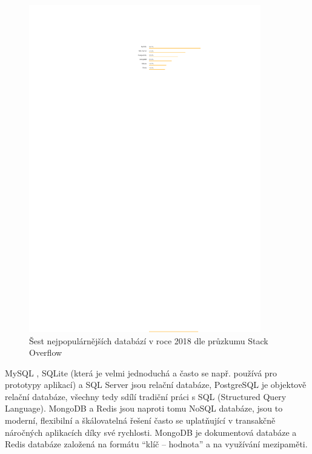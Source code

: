     \begin{figure}[ht]\centering
    	\includegraphics[width=0.9\textwidth]{img/stack-stats-db}
    	\caption[Popularita databází v roce 2018 dle průzkumu Stack Overflow]{Šest nejpopulárnějších databází v roce 2018 dle průzkumu Stack Overflow \cite{stack-stats18}}\label{fig:stack-stats18-db}
    \end{figure}
    
    MySQL \cite{db1}, SQLite \cite{db2} (která je velmi jednoduchá a často se např. používá pro prototypy aplikací) a SQL Server jsou relační databáze, PostgreSQL \cite{db3} je objektově relační databáze, všechny tedy sdílí tradiční práci s SQL (Structured Query Language). MongoDB \cite{db4} a Redis \cite{db5} jsou naproti tomu NoSQL databáze, jsou to moderní, flexibilní a škálovatelná řešení často se uplatňující v transakčně náročných aplikacích díky své rychlosti. MongoDB je dokumentová databáze a Redis databáze založená na formátu \enquote{klíč -- hodnota} a na využívání mezipaměti.
    
    

